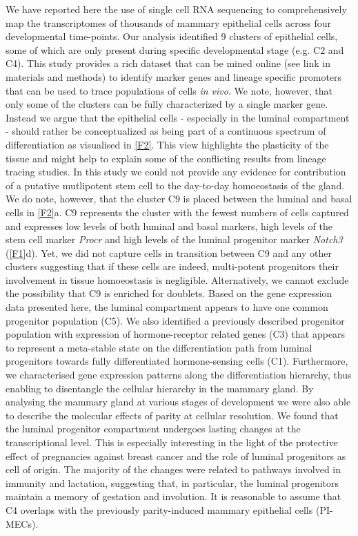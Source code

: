 \documentclass[titlepage, 12pt, oneside]{amsart}
\begin{document}
We have reported here the use of single cell RNA sequencing to comprehensively map the transcriptomes of thousands of mammary epithelial cells across four developmental time-points.
Our analysis identified 9 clusters of epithelial cells, some of which are only present during specific developmental stage (e.g. C2 and C4).
This study provides a rich dataset that can be mined online (see link in materials and methods) to identify marker genes and lineage specific promoters that can be used to trace populations of cells \textit{in vivo}.
We note, however, that only some of the clusters can be fully characterized by a single marker gene.
Instead we argue that the epithelial cells - especially in the luminal compartment - should rather be conceptualized as being part of a continuous spectrum of differentiation as visualised in \autoref{F2}.
This view highlights the plasticity of the tissue and might help to explain some of the conflicting results from lineage tracing studies\autocite{Inman2015}.
In this study we could not provide any evidence for contribution of a putative mutlipotent stem cell to the day-to-day homoeostasis of the gland.
We do note, however, that the cluster C9 is placed between the luminal and basal cells in \autoref{F2}a.
C9 represents the cluster with the fewest numbers of cells captured and expresses low levels of both luminal and basal markers, high levels of the stem cell marker \textit{Procr}\autocite{Wang2015} and high levels of the luminal progenitor marker \textit{Notch3}\autocite{Lafkas2013} (\autoref{F1}d).
Yet, we did not capture cells in transition between C9 and any other clusters suggesting that if these cells are indeed, multi-potent progenitors their involvement in tissue homoeostasis is negligible.
Alternatively, we cannot exclude the possibility that C9 is enriched for doublets.
Based on the gene expression data presented here, the luminal compartment appears to have one common progenitor population (C5).
We also identified a previously described progenitor population with expression of hormone-receptor related genes (C3) that appears to represent a meta-stable state on the differentiation path from luminal progenitors towards fully differentiated hormone-sensing cells (C1).
Furthermore, we characterised gene expression patterns along the differentiation hierarchy, thus enabling to disentangle the cellular hierarchy in the mammary gland.
By analysing the mammary gland at various stages of development we were also able to describe the molecular effects of parity at cellular resolution.
We found that the luminal progenitor compartment undergoes lasting changes at the transcriptional level.
This is especially interesting in the light of the protective effect of pregnancies against breast cancer and the role of luminal progenitors as cell of origin.
The majority of the changes were related to pathways involved in immunity and lactation, suggesting that, in particular, the luminal progenitors maintain a memory of gestation and involution.
It is reasonable to assume that C4 overlaps with the previously parity-induced mammary epithelial cells (PI-MECs)\autocite{Wagner2002}.
\end{document}
